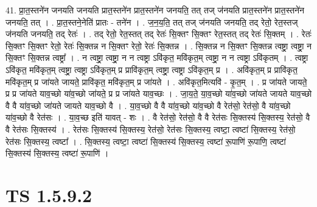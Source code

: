 \documentclass[17pt]{extarticle}
\begin{document}
41. प्रा॒त॒स्तने॑न जनयति जनयति प्रात॒स्तने॑न प्रात॒स्तने॑न जनयति॒ तत् तज् ज॑नयति प्रात॒स्तने॑न प्रात॒स्तने॑न जनयति॒ तत् । . प्रा॒त॒स्तने॒नेति॑ प्रातः - तने॑न । . ज॒न॒य॒ति॒ तत् तज् ज॑नयति जनयति॒ तद् रेतो॒ रेत॒स्तज् ज॑नयति जनयति॒ तद् रेतः॑ । . तद् रेतो॒ रेत॒स्तत् तद् रेतः॑ सि॒क्तꣳ सि॒क्तꣳ रेत॒स्तत् तद् रेतः॑ सि॒क्तम् । . रेतः॑ सि॒क्तꣳ सि॒क्तꣳ रेतो॒ रेतः॑ सि॒क्तन्न न सि॒क्तꣳ रेतो॒ रेतः॑ सि॒क्तन्न । . सि॒क्तन्न न सि॒क्तꣳ सि॒क्तन्न त्वष्ट्रा॒ त्वष्ट्रा॒ न सि॒क्तꣳ सि॒क्तन्न त्वष्ट्रा᳚ । . न त्वष्ट्रा॒ त्वष्ट्रा॒ न न त्वष्ट्रा ऽवि॑कृत॒ मवि॑कृत॒म् त्वष्ट्रा॒ न न त्वष्ट्रा ऽवि॑कृतम् । . त्वष्ट्रा ऽवि॑कृत॒ मवि॑कृत॒म् त्वष्ट्रा॒ त्वष्ट्रा ऽवि॑कृत॒म् प्र प्रावि॑कृत॒म् त्वष्ट्रा॒ त्वष्ट्रा ऽवि॑कृत॒म् प्र । . अवि॑कृत॒म् प्र प्रावि॑कृत॒ मवि॑कृत॒म् प्र जा॑यते जायते॒ प्रावि॑कृत॒ मवि॑कृत॒म् प्र जा॑यते । . अवि॑कृत॒मित्यवि॑ - कृ॒त॒म् । . प्र जा॑यते जायते॒ प्र प्र जा॑यते याव॒च्छो या॑व॒च्छो जा॑यते॒ प्र प्र जा॑यते याव॒च्छः । . जा॒य॒ते॒ या॒व॒च्छो या॑व॒च्छो जा॑यते जायते याव॒च्छो वै वै या॑व॒च्छो जा॑यते जायते याव॒च्छो वै । . या॒व॒च्छो वै वै या॑व॒च्छो या॑व॒च्छो वै रेत॑सो॒ रेत॑सो॒ वै या॑व॒च्छो या॑व॒च्छो वै रेत॑सः । . या॒व॒च्छ इति॑ यावत् - शः । . वै रेत॑सो॒ रेत॑सो॒ वै वै रेत॑सः सि॒क्तस्य॑ सि॒क्तस्य॒ रेत॑सो॒ वै वै रेत॑सः सि॒क्तस्य॑ । . रेत॑सः सि॒क्तस्य॑ सि॒क्तस्य॒ रेत॑सो॒ रेत॑सः सि॒क्तस्य॒ त्वष्टा॒ त्वष्टा॑ सि॒क्तस्य॒ रेत॑सो॒ रेत॑सः सि॒क्तस्य॒ त्वष्टा᳚ । . सि॒क्तस्य॒ त्वष्टा॒ त्वष्टा॑ सि॒क्तस्य॑ सि॒क्तस्य॒ त्वष्टा॑ रू॒पाणि॑ रू॒पाणि॒ त्वष्टा॑ सि॒क्तस्य॑ सि॒क्तस्य॒ त्वष्टा॑ रू॒पाणि॑ । \newline
\pagebreak
{}
\section*{ TS 1.5.9.2 }
\end{document}
